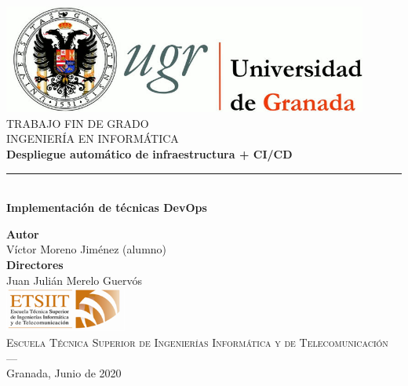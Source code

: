 \begin{titlepage}
 
 
\newlength{\centeroffset}
\setlength{\centeroffset}{-0.5\oddsidemargin}
\addtolength{\centeroffset}{0.5\evensidemargin}
\thispagestyle{empty}

\noindent\hspace*{\centeroffset}\begin{minipage}{\textwidth}

\centering
\includegraphics[width=0.9\textwidth]{imagenes/logo_ugr.jpg}\\[1.4cm]

\textsc{ \Large TRABAJO FIN DE GRADO\\[0.2cm]}
\textsc{ INGENIERÍA EN INFORMÁTICA}\\[1cm]
% 
{\Huge\bfseries Despliegue automático de infraestructura + CI/CD \\
}
\noindent\rule[-1ex]{\textwidth}{3pt}\\[3.5ex]
{\large\bfseries Implementación de técnicas DevOps}
\end{minipage}

\vspace{2.5cm}
\noindent\hspace*{\centeroffset}\begin{minipage}{\textwidth}
\centering

\textbf{Autor}\\ {Víctor Moreno Jiménez (alumno)}\\[2.5ex]
\textbf{Directores}\\
{Juan Julián Merelo Guervós}\\[2.5ex]
\includegraphics[width=0.3\textwidth]{imagenes/etsiit_logo.png}\\[0.1cm]
\textsc{Escuela Técnica Superior de Ingenierías Informática y de Telecomunicación}\\
\textsc{---}\\
Granada, Junio de 2020
\end{minipage}
\end{titlepage}


